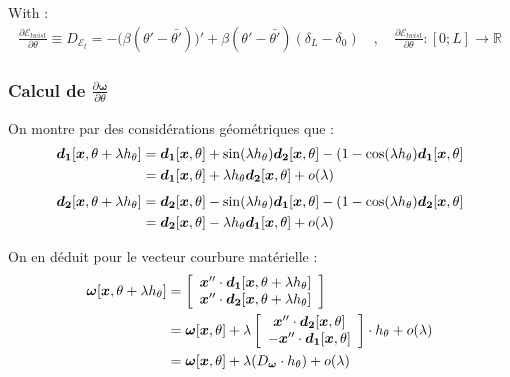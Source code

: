 With :
\begin{align}
\frac{\partial \mathcal{E}_{twist}}{\partial \theta} \equiv D_{\mathcal{E}_t} = - \big(\beta(\theta'-{\bar{\theta'}})\big)' + \beta(\theta'-{\bar{\theta'}})(\delta_L-\delta_0) \quad , \quad \frac{\partial \mathcal{E}_{twist}}{\partial \theta} : [0;L] \longrightarrow 	\mathbb{R}
\end{align}



\subsubsection{Calcul de $\frac{\partial \boldsymbol{\omega}}{\partial \theta}$}

On montre par des considérations géométriques que :
\begin{align}
	\boldsymbol{d_1}[\boldsymbol{x}, \theta + \lambda h_{\theta}] & = \boldsymbol{d_1}[\boldsymbol{x}, \theta] + \sin(\lambda h_{\theta})\boldsymbol{d_2}[\boldsymbol{x}, \theta] - (1-\cos(\lambda h_{\theta})\boldsymbol{d_1}[\boldsymbol{x}, \theta] \\
   	& = \boldsymbol{d_1}[\boldsymbol{x}, \theta] + \lambda h_{\theta}\boldsymbol{d_2}[\boldsymbol{x}, \theta] + o(\lambda) \notag
\end{align}
\begin{align}
	\boldsymbol{d_2}[\boldsymbol{x}, \theta + \lambda h_{\theta}] & = \boldsymbol{d_2}[\boldsymbol{x}, \theta] - \sin(\lambda h_{\theta})\boldsymbol{d_1}[\boldsymbol{x}, \theta] - (1-\cos(\lambda h_{\theta})\boldsymbol{d_2}[\boldsymbol{x}, \theta] \\
   	& = \boldsymbol{d_2}[\boldsymbol{x}, \theta] - \lambda h_{\theta}\boldsymbol{d_1}[\boldsymbol{x}, \theta] + o(\lambda) \notag
\end{align}

On en déduit pour le vecteur courbure matérielle :
\begin{align}
	\boldsymbol{\omega}[\boldsymbol{x}, \theta + \lambda h_{\theta}] & = 
	\left[\begin{array}{c}
	\boldsymbol{x}'' \cdot  \boldsymbol{d_1}[\boldsymbol{x}, \theta + \lambda h_{\theta}]\\
	\boldsymbol{x}'' \cdot \boldsymbol{d_2}[\boldsymbol{x}, \theta + \lambda h_{\theta}]\\
	\end{array}\right] \\
	& = \boldsymbol{\omega}[\boldsymbol{x}, \theta] + \lambda 
	\left[\begin{array}{c}
	\boldsymbol{x}'' \cdot  \boldsymbol{d_2}[\boldsymbol{x}, \theta]\\
	- \boldsymbol{x}'' \cdot \boldsymbol{d_1}[\boldsymbol{x}, \theta]\\
	\end{array}\right] \cdot h_{\theta}
	 + o(\lambda)\notag\\
	 & = \boldsymbol{\omega}[\boldsymbol{x}, \theta] + \lambda(D_{\boldsymbol{\omega}} \cdot h_{\theta}) + o(\lambda)\notag
\end{align}

